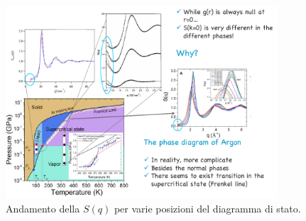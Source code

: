 \begin{figure}[ht]
	\centering
	\includegraphics[width=0.9\textwidth]{figures/slide-tesi.png}
	\caption{Andamento della $S(q)$ per varie posizioni del diagramma di stato.}
	\label{fig:figures-slide-tesi-png}
\end{figure}
